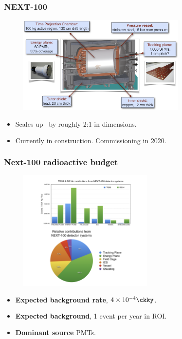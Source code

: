 \begin{frame}
\frametitle{NEXT-100}

\begin{figure}[tbh!]
  \begin{center}
      \includegraphics[width=0.75\textwidth]{moriond/next-100.png}   
  \end{center}
\end{figure}

\begin{itemize}
\item Scales up \NEW\ by roughly 2:1 in dimensions. 
\item Currently in construction. Commissioning in 2020. 
\end{itemize}
\end{frame}

\begin{frame}
\frametitle{Next-100 radioactive budget}
\begin{figure}[tbh!]
  \begin{center}
      \includegraphics[width=0.6\textwidth]{moriond/next-100-radio_budget.png}
  \end{center}
 \end{figure}
 
\begin{itemize}
\item {\bf Expected background rate}, $ 4 \times 10^{-4} \ckky$. 
\item {\bf Expected background}, 1 event per year in ROI. 
\item {\bf Dominant source} PMTs. 
\end{itemize}
\end{frame}



